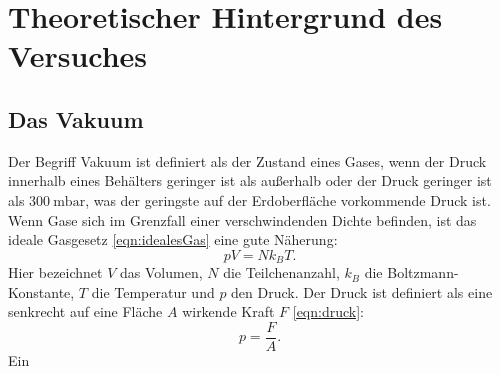 \section{Theoretischer Hintergrund des Versuches}
\label{sec:Theorie}

\subsection{Das Vakuum}
Der Begriff Vakuum ist definiert als der Zustand eines Gases, wenn der Druck
innerhalb eines Behälters geringer ist als außerhalb oder der Druck geringer
ist als $\SI{300}{\milli\bar}$, was der geringste auf der Erdoberfläche
vorkommende Druck ist.\\
Wenn Gase sich im Grenzfall einer verschwindenden Dichte befinden, ist das
ideale Gasgesetz \ref{eqn:idealesGas} eine gute Näherung:
\begin{equation}
 pV = N k_{B} T.
 \label{eqn:idealesGas}
\end{equation}
Hier bezeichnet $V$ das Volumen, $N$ die Teilchenanzahl, $k_{B}$ die
Boltzmann-Konstante, $T$ die Temperatur und $p$ den Druck.
Der Druck ist definiert als eine senkrecht auf eine Fläche $A$ wirkende Kraft $F$ \ref{eqn:druck}:
\begin{equation}
  p = \frac{F}{A}.
  \label{eqn:druck}
\end{equation}
Ein
